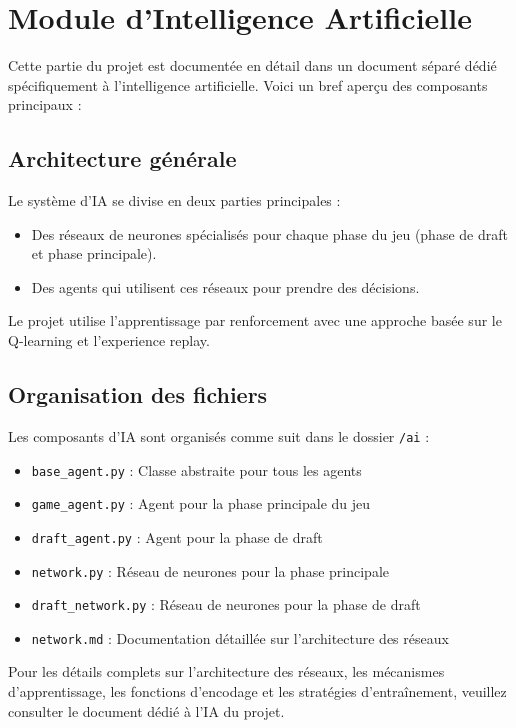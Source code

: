 \documentclass[]{article}
\begin{document}
\section{Module d'Intelligence Artificielle}

Cette partie du projet est documentée en détail dans un document séparé dédié spécifiquement à l'intelligence artificielle. Voici un bref aperçu des composants principaux :

\subsection{Architecture générale}
Le système d'IA se divise en deux parties principales :
\begin{itemize}
  \item Des réseaux de neurones spécialisés pour chaque phase du jeu (phase de draft et phase principale).
  \item Des agents qui utilisent ces réseaux pour prendre des décisions.
\end{itemize}

Le projet utilise l'apprentissage par renforcement avec une approche basée sur le Q-learning et l'experience replay.

\subsection{Organisation des fichiers}
Les composants d'IA sont organisés comme suit dans le dossier \texttt{/ai} :
\begin{itemize}
  \item \texttt{base\_agent.py} : Classe abstraite pour tous les agents
  \item \texttt{game\_agent.py} : Agent pour la phase principale du jeu
  \item \texttt{draft\_agent.py} : Agent pour la phase de draft
  \item \texttt{network.py} : Réseau de neurones pour la phase principale
  \item \texttt{draft\_network.py} : Réseau de neurones pour la phase de draft
  \item \texttt{network.md} : Documentation détaillée sur l'architecture des réseaux
\end{itemize}

Pour les détails complets sur l'architecture des réseaux, les mécanismes d'apprentissage, les fonctions d'encodage et les stratégies d'entraînement, veuillez consulter le document dédié à l'IA du projet.
\end{document}
